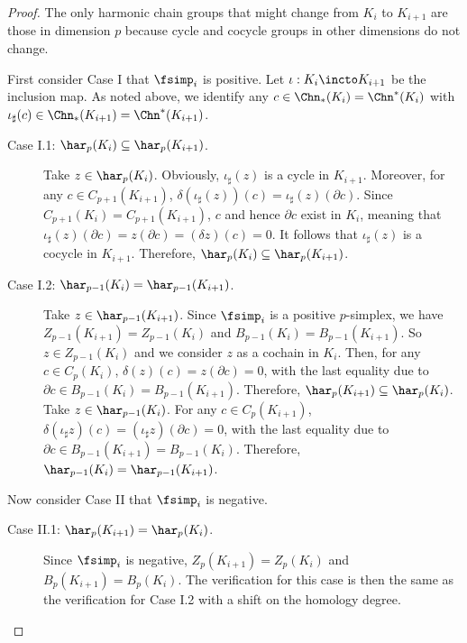 \begin{proof}
The only harmonic chain groups that might change from $K_i$ to $K_{i+1}$ are 
those in dimension $p$ because cycle and cocycle groups in other dimensions  do not change.

First consider Case I that $\fsimp_i$ is positive.
Let $\iota: K_i \incto K_{i+1}$ be the inclusion map.  As noted above, we identify any $c \in \Chn_*(K_i)=\Chn^*(K_i)$ with $\iota_\sharp (c) \in \Chn_*(K_{i+1})=\Chn^*(K_{i+1})$.

\begin{description}
\item[Case I.1: $\har_p(K_i)\subseteq \har_p(K_{i+1})$.] 
Take $z \in \har_p(K_{i})$. 
Obviously, $\iota_\sharp(z)$ is a cycle in $K_{i+1}$.
Moreover, for any $c \in C_{p+1} (K_{i+1})$, $\delta (\iota_\sharp (z)) (c) = \iota_\sharp(z) (\partial c)$. Since $C_{p+1} (K_i)= C_{p+1} (K_{i+1})$, $c$ and hence $\partial c$ exist in $K_i$, meaning that $\iota_\sharp(z) (\partial c) = z (\partial c) = (\delta z) (c) = 0$. It follows that $\iota_\sharp(z)$ is a cocycle in $K_{i+1}$. Therefore, $\har_p(K_i) \subseteq \har_p (K_{i+1})$.

\item[Case I.2: $\har_{p-1}(K_i)= \har_{p-1}(K_{i+1})$.] 
Take $z \in \har_{p-1}(K_{i+1})$. 
Since $\fsimp_i$ is a positive $p$-simplex,
we have $Z_{p-1}(K_{i+1}) = Z_{p-1}(K_i)$
and $B_{p-1}(K_{i})=B_{p-1}(K_{i+1})$.
So $z \in Z_{p-1}(K_i)$
and we consider $z$ as a cochain in $K_i$.
Then, for any $c \in C_{p}(K_{i})$,  $\delta (z) (c) = z(\partial c) = 0$, with the last equality due to 
$\partial c\in B_{p-1}(K_{i})=B_{p-1}(K_{i+1})$.
Therefore, $\har_p(K_{i+1}) \subseteq \har_p(K_i)$.
Take $z \in \har_{p-1}(K_{i})$. For any $c \in C_{p}(K_{i+1})$,  $\delta (\iota_\sharp z) (c) = (\iota_\sharp z)(\partial c) = 0$, 
with the last equality due to 
$\partial c\in B_{p-1}(K_{i+1})=B_{p-1}(K_{i})$.
Therefore, $\har_{p-1}(K_i)= \har_{p-1}(K_{i+1})$.
\end{description}
    
Now consider Case II that $\fsimp_i$ is negative.

\begin{description}
\item[Case II.1: $\har_p(K_{i+1}) = \har_p(K_i)$.] 
Since $\fsimp_i$ is negative, $Z_p(K_{i+1}) = Z_p(K_i)$
and $B_p(K_{i+1})=B_p(K_{i})$.
The verification for this case is then the same as the verification
for Case I.2 with a shift on the homology degree.


\end{description}
\end{proof}
